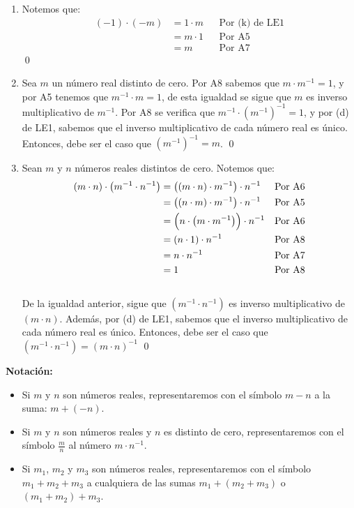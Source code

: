 \documentclass[11pt]{article}
\begin{document}
\begin{enumerate}[label=\alph*), font=\bfseries]
    \item Notemos que:
    \begin{align*}
        (-1) \cdot (-m) &= 1 \cdot m && \text{Por (k) de LE1}\\
        &= m \cdot 1 && \text{Por A5}\\
        &= m && \text{Por A7}
    \end{align*} \qed

    \item Sea $m$ un número real distinto de cero. Por A8 sabemos que $m \cdot m^{-1}=1$, y por A5 tenemos que $m^{-1} \cdot m=1$, de esta igualdad se sigue que $m$ es inverso multiplicativo de $m^{-1}$. Por A8 se verifica que $ m^{-1} \cdot \left( m^{-1} \right)^{-1} =1$, y por (d) de LE1, sabemos que el inverso multiplicativo de cada número real es único. Entonces, debe ser el caso que $\left( m^{-1} \right )^{-1}=m$.
    \qed

    \item Sean $m$ y $n$ números reales distintos de cero. Notemos que:
    \begin{align*}
        \left(m \cdot n \right) \cdot  \left(m^{-1} \cdot n^{-1}  \right)	&=	 \left( \left(m \cdot n \right) \cdot m^{-1}  \right) \cdot n^{-1}  	&& \text{Por A6}\\
    &=	 \left( \left(n \cdot m \right) \cdot m^{-1}  \right) \cdot n^{-1}  	&& \text{Por A5}\\
    &=	 \Bigl(n \cdot  \left(m \cdot m^{-1}\right) \Bigr) \cdot n^{-1}	&& \text{Por A6}\\
    &=	 \left(n \cdot 1 \right) \cdot n^{-1}	&& \text{Por A8}\\
    &=	n \cdot n^{-1}	&& \text{Por A7}\\
    &=	1	&& \text{Por A8}
    \end{align*} \\
    De la igualdad anterior, sigue que $\left(m^{-1} \cdot n^{-1} \right)$ es inverso multiplicativo de $\left( m \cdot n \right)$. Además, por (d) de LE1, sabemos que el inverso multiplicativo de cada número real es único. Entonces, debe ser el caso que $\left(m^{-1} \cdot n^{-1} \right) = \left( m \cdot n \right)^{-1}$ \qed
\end{enumerate}

\textbf{Notación:}

\begin{itemize}
    \item Si $m$ y $n$ son números reales, representaremos con el símbolo $m-n$ a la suma: $m+ (-n)$.
    \item Si $m$ y $n$ son números reales y $n$ es distinto de cero, representaremos con el símbolo $ \frac{m}{n}$ al número $m \cdot n^{-1} $.
    \item Si $m_1$, $m_2$ y $m_3$ son números reales, representaremos con el símbolo $m_1+m_2+ m_3$ a cualquiera de las sumas $m_1+ \left(m_2+ m_3 \right)$ o $\left(m_1+ m_2 \right)+ m_3$.
\end{itemize}
\end{document}
